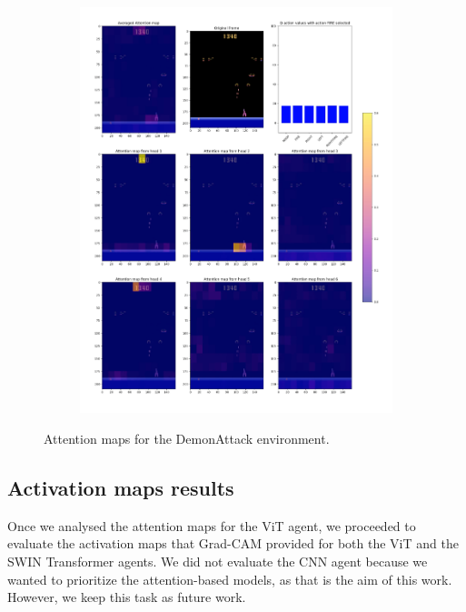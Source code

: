 \begin{figure}[htbp]
\begin{subfigure}{0.48\textwidth}
		\includegraphics[width=\linewidth]{figures/demonattack_attn_maps2}
		\caption{}
		\label{fig:demonattackattnmaps2}
	\end{subfigure}
	\caption{Attention maps for the DemonAttack environment.}
	\label{}
\end{figure}

\subsection{Activation maps results}
\label{sec:eval_actv_explainability}
Once we analysed the attention maps for the ViT agent, we proceeded to evaluate the activation maps that Grad-CAM provided for both the ViT and the SWIN Transformer agents. We did not evaluate the CNN agent because we wanted to prioritize the attention-based models, as that is the aim of this work. However, we keep this task as future work.

